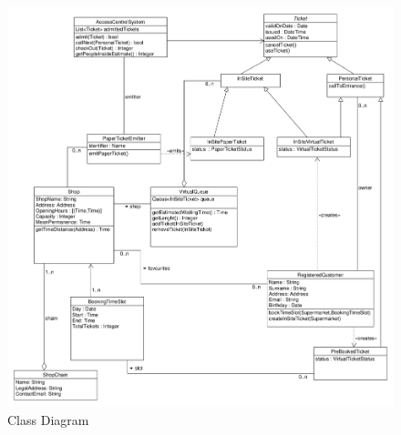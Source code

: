\begin{figure}[H]
    \centering
    \includegraphics[width=\textwidth]{Images/UML_class_synthetic.png}
    \caption{\label{fig:Booked_Ticket_State}Class Diagram}
\end{figure}

\vfill
